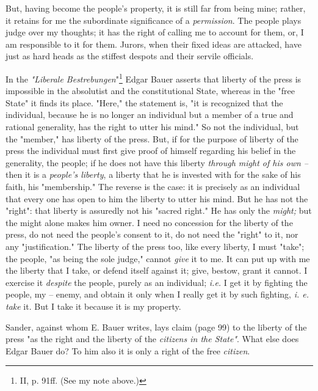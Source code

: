 \documentclass[a4paper]{book}
\begin{document}
But, having become the people's property, it is still far from being mine; 
rather, it retains for me the subordinate significance of a 
\textit{permission}. The people plays judge over my thoughts; it has the right 
of calling me to account for them, or, I am responsible to it for them. 
Jurors, when their fixed ideas are attacked, have just as hard heads as the 
stiffest despots and their servile officials.

In the \textit{"{}Liberale Bestrebungen}"{}\footnote{II, p. 91ff. (See my note 
above.)} Edgar Bauer asserts that liberty of the press is impossible in the 
absolutist and the constitutional State, whereas in the "{}free State"{} it 
finds its place. "{}Here,"{} the statement is, "{}it is recognized that the 
individual, because he is no longer an individual but a member of a true and 
rational generality, has the right to utter his mind."{} So not the 
individual, but the "{}member,"{} has liberty of the press. But, if for the 
purpose of liberty of the press the individual must first give proof of 
himself regarding his belief in the generality, the people; if he does not 
have this liberty \textit{through might of his own --} then it is a 
\textit{people's liberty}, a liberty that he is invested with for the sake of 
his faith, his "{}membership."{} The reverse is the case: it is precisely as 
an individual that every one has open to him the liberty to utter his mind. 
But he has not the "{}right"{}: that liberty is assuredly not his "{}sacred 
right."{} He has only the \textit{might;} but the might alone makes him owner. 
I need no concession for the liberty of the press, do not need the people's 
consent to it, do not need the "{}right"{} to it, nor any "{}justification."{} 
The liberty of the press too, like every liberty, I must "{}take"{}; the 
people, "{}as being the sole judge,"{} cannot \textit{give} it to me. It can 
put up with me the liberty that I take, or defend itself against it; give, 
bestow, grant it cannot. I exercise it \textit{despite} the people, purely as 
an individual; \textit{i.e.} I get it by fighting the people, my -- enemy, and 
obtain it only when I really get it by such fighting, \textit{i. e. take} it. 
But I take it because it is my property.

Sander, against whom E. Bauer writes, lays claim (page 99) to the liberty of 
the press "{}as the right and the liberty of the \textit{citizens in the 
State"{}}. What else does Edgar Bauer do? To him also it is only a right of 
the free \textit{citizen}.
\end{document}
